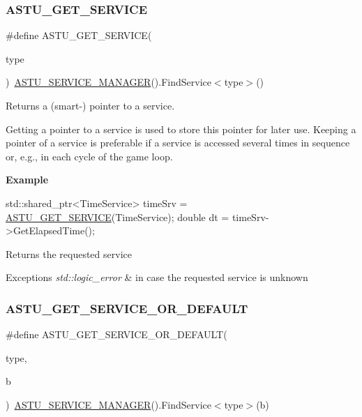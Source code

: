 \subsubsection{\texorpdfstring{A\+S\+T\+U\+\_\+\+G\+E\+T\+\_\+\+S\+E\+R\+V\+I\+CE}{ASTU\_GET\_SERVICE}}
{\footnotesize\ttfamily \#define A\+S\+T\+U\+\_\+\+G\+E\+T\+\_\+\+S\+E\+R\+V\+I\+CE(\begin{DoxyParamCaption}\item[{}]{type }\end{DoxyParamCaption})~\hyperlink{group__srv__group_ga5216c57cf872d6a0c05d0e6f33c66fc7}{A\+S\+T\+U\+\_\+\+S\+E\+R\+V\+I\+C\+E\+\_\+\+M\+A\+N\+A\+G\+ER}().Find\+Service$<$type$>$()}

Returns a (smart-\/) pointer to a service.

Getting a pointer to a service is used to store this pointer for later use. Keeping a pointer of a service is preferable if a service is accessed several times in sequence or, e.\+g., in each cycle of the game loop.

{\bfseries Example}


\begin{DoxyCode}
std::shared\_ptr<TimeService> timeSrv = \hyperlink{group__srv__group_ga42e4ee34b527cd82ba6c0013b5d1441e}{ASTU\_GET\_SERVICE}(TimeService);
\textcolor{keywordtype}{double} dt = timeSrv->GetElapsedTime();
\end{DoxyCode}


\begin{DoxyReturn}{Returns}
the requested service 
\end{DoxyReturn}

\begin{DoxyExceptions}{Exceptions}
{\em std\+::logic\+\_\+error} & in case the requested service is unknown \\
\hline
\end{DoxyExceptions}
\mbox{\label{group__srv__group_gadd58983b12766275d79b748307fcd637}} 
\subsubsection{\texorpdfstring{A\+S\+T\+U\+\_\+\+G\+E\+T\+\_\+\+S\+E\+R\+V\+I\+C\+E\+\_\+\+O\+R\+\_\+\+D\+E\+F\+A\+U\+LT}{ASTU\_GET\_SERVICE\_OR\_DEFAULT}}
{\footnotesize\ttfamily \#define A\+S\+T\+U\+\_\+\+G\+E\+T\+\_\+\+S\+E\+R\+V\+I\+C\+E\+\_\+\+O\+R\+\_\+\+D\+E\+F\+A\+U\+LT(\begin{DoxyParamCaption}\item[{}]{type,  }\item[{}]{b }\end{DoxyParamCaption})~\hyperlink{group__srv__group_ga5216c57cf872d6a0c05d0e6f33c66fc7}{A\+S\+T\+U\+\_\+\+S\+E\+R\+V\+I\+C\+E\+\_\+\+M\+A\+N\+A\+G\+ER}().Find\+Service$<$type$>$(b)}

